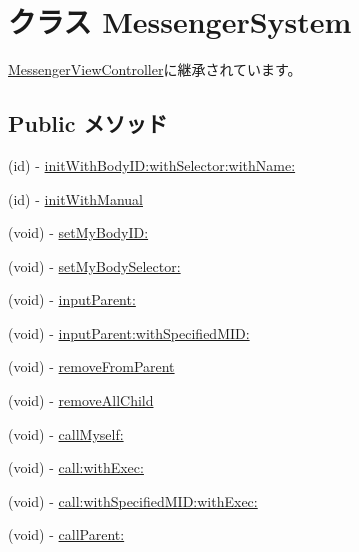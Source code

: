 \hypertarget{interface_messenger_system}{
\section{クラス MessengerSystem}
\label{dc/dc9/interface_messenger_system}
}


\hyperlink{interface_messenger_view_controller}{MessengerViewController}に継承されています。

\subsection*{Public メソッド}
\begin{DoxyCompactItemize}
\item 
(id) -\/ \hyperlink{interface_messenger_system_a1127377a8d677d41693b435758790e79}{initWithBodyID:withSelector:withName:}
\item 
(id) -\/ \hyperlink{interface_messenger_system_a12fac5bf1d29c2b960e02dab4db80944}{initWithManual}
\item 
(void) -\/ \hyperlink{interface_messenger_system_a2a5f63ed86009e8b451bbbb621e9a94b}{setMyBodyID:}
\item 
(void) -\/ \hyperlink{interface_messenger_system_aafb5a2e5d48a09627f32a4d3c2e3fa29}{setMyBodySelector:}
\item 
(void) -\/ \hyperlink{interface_messenger_system_a2dc1b363d2e1b00f232fd829225a9ff3}{inputParent:}
\item 
(void) -\/ \hyperlink{interface_messenger_system_ae7f62ea0ebdb51b5f2628f3002add7e7}{inputParent:withSpecifiedMID:}
\item 
(void) -\/ \hyperlink{interface_messenger_system_a1b95b2f06c63a72a776c853d74e11b03}{removeFromParent}
\item 
(void) -\/ \hyperlink{interface_messenger_system_abfbdbb7d723b910d012d980daacbcd9b}{removeAllChild}
\item 
(void) -\/ \hyperlink{interface_messenger_system_a0d78a7be460a84be04e67d73ddcf4248}{callMyself:}
\item 
(void) -\/ \hyperlink{interface_messenger_system_ae9f0c6c7daf251eb28aad584b1eca292}{call:withExec:}
\item 
(void) -\/ \hyperlink{interface_messenger_system_ae923fe829663d8974dc34063bd32c4a2}{call:withSpecifiedMID:withExec:}
\item 
(void) -\/ \hyperlink{interface_messenger_system_acf758deab41281c54d928be2a72fc9ba}{callParent:}
\item 

\end{DoxyCompactItemize}
